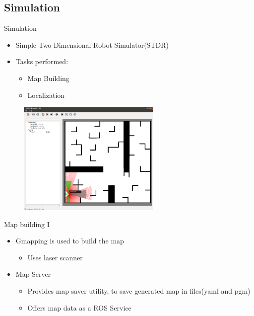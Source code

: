 
\subsection{Simulation}

\begin{frame}{Simulation}
    \begin{itemize}
        \item Simple Two Dimensional Robot Simulator(STDR)	
        \item Tasks  performed:
        \begin{itemize}
            \item Map Building
            \item Localization
        \end{itemize}
    \end{itemize}
    
    \centering
    \includegraphics[width=90mm,height=55mm]{gfx/stdr_simulator}
    
\end{frame}
\begin{frame}{Map building I}
    \begin{itemize}
        \item Gmapping is used to build the map
        \begin{itemize}
            \item Uses laser scanner 
        \end{itemize}
        \item Map Server
        \begin{itemize}
            \item Provides map saver utility, to save generated map in files(yaml and pgm)
            \item Offers map data as a ROS Service
        \end{itemize}
        
    \end{itemize}
\end{frame}
